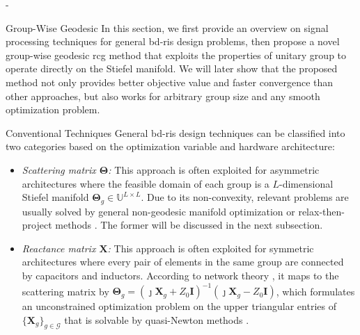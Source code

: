 \begin{section}{-}
	\begin{subsection}{Group-Wise Geodesic }
		In this section, we first provide an overview on signal processing techniques for general \gls{bd}-\gls{ris} design problems, then propose a novel group-wise geodesic \gls{rcg} method that exploits the properties of unitary group to operate directly on the Stiefel manifold.
		We will later show that the proposed method not only provides better objective value and faster convergence than other approaches, but also works for arbitrary group size and any smooth optimization problem.
		\begin{subsubsection}{Conventional Techniques}
			General \gls{bd}-\gls{ris} design techniques can be classified into two categories based on the optimization variable and hardware architecture:
			\begin{itemize}
				\item \emph{Scattering matrix $\mathbf{\Theta}$:} This approach is often exploited for asymmetric architectures where the feasible domain of each group is a $L$-dimensional Stiefel manifold $\mathbf{\Theta}_g \in \mathbb{U}^{L \times L}$. Due to its non-convexity, relevant problems are usually solved by general non-geodesic manifold optimization \cite{Li2023b,Li2023c,Bartoli2023} or relax-then-project methods \cite{Fang2023}. The former will be discussed in the next subsection.
				\item \emph{Reactance matrix $\mathbf{X}$:} This approach is often exploited for symmetric architectures where every pair of elements in the same group are connected by capacitors and inductors. According to network theory \cite{Pozar2011}, it maps to the scattering matrix by $\mathbf{\Theta}_g = (\jmath \mathbf{X}_g + Z_0 \mathbf{I})^{-1} (\jmath \mathbf{X}_g - Z_0 \mathbf{I})$, which formulates an unconstrained optimization problem on the upper triangular entries of $\{\mathbf{X}_g\}_{g \in \mathcal{G}}$ that is solvable by quasi-Newton methods \cite{Shen2020a}.
			\end{itemize}
		\end{subsubsection}


\end{subsection}
\end{section}
